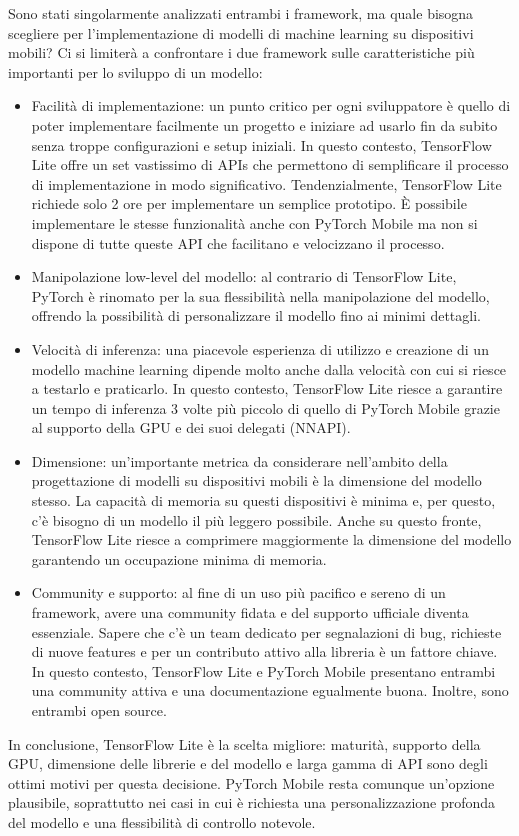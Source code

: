 Sono stati singolarmente analizzati entrambi i framework, ma quale bisogna scegliere per l’implementazione di modelli di machine learning su dispositivi mobili?
Ci si limiterà a confrontare i due framework sulle caratteristiche più importanti per lo sviluppo di un modello:
\begin{itemize}
    \item Facilità di implementazione: un punto critico per ogni sviluppatore è quello di poter implementare facilmente un progetto e iniziare ad usarlo fin da subito senza troppe configurazioni e setup iniziali.
    In questo contesto, TensorFlow Lite offre un set vastissimo di APIs\cite{tensorvspyt} che permettono di semplificare il processo di implementazione in modo significativo. Tendenzialmente, TensorFlow Lite richiede solo 2 ore per
    implementare un semplice prototipo. È possibile implementare le stesse funzionalità anche con PyTorch Mobile ma non si dispone di tutte queste API che facilitano e velocizzano il processo.
    \item Manipolazione low-level del modello: al contrario di TensorFlow Lite, PyTorch è rinomato per la sua flessibilità nella manipolazione del modello\cite{pytorchvstensor}, offrendo la possibilità di personalizzare il modello fino ai minimi dettagli.
    \item Velocità di inferenza: una piacevole esperienza di utilizzo e creazione di un modello machine learning dipende molto anche dalla velocità con cui si riesce a testarlo e praticarlo. In questo contesto, TensorFlow Lite riesce a
    garantire un tempo di inferenza 3 volte più piccolo di quello di PyTorch Mobile grazie al supporto della GPU e dei suoi delegati (NNAPI).
    \item Dimensione: un’importante metrica da considerare nell’ambito della progettazione di modelli su dispositivi mobili è la dimensione del modello stesso. La capacità di memoria su questi dispositivi è minima e, per questo, c'è
    bisogno di un modello il più leggero possibile. Anche su questo fronte, TensorFlow Lite riesce a comprimere maggiormente la dimensione del modello garantendo un occupazione minima di memoria.
    \item Community e supporto: al fine di un uso più pacifico e sereno di un framework, avere una community fidata e del supporto ufficiale diventa essenziale. Sapere che c’è un team dedicato per segnalazioni di bug,
    richieste di nuove features e per un contributo attivo alla libreria è un fattore chiave. In questo contesto, TensorFlow Lite e PyTorch Mobile presentano entrambi una community attiva e una documentazione egualmente buona.
    Inoltre, sono entrambi open source.
\end{itemize}
In conclusione, TensorFlow Lite è la scelta migliore: maturità, supporto della GPU, dimensione delle librerie e del modello e larga gamma di API sono degli ottimi motivi per questa decisione.
PyTorch Mobile resta comunque un’opzione plausibile, soprattutto nei casi in cui è richiesta una personalizzazione profonda del modello e una flessibilità di controllo notevole.
